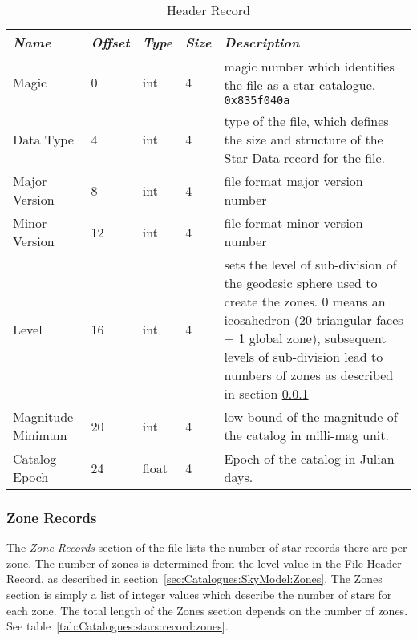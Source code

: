 \begin{table}[htbp]
\begin{tabularx}{\textwidth}{llllX}\toprule
\emph{Name} & \emph{Offset} & \emph{Type} & \emph{Size} & \emph{Description}\\\midrule
Magic             &  0 & int   & 4 & magic number which identifies the file as a star catalogue. \texttt{0x835f040a}\\%
Data Type         &  4 & int   & 4 & type of the file, which defines the size and structure 
                                   of the Star Data record for the file.\\%
Major Version     &  8 & int   & 4 & file format major version number\\%
Minor Version     & 12 & int   & 4 & file format minor version number\\%
Level             & 16 & int   & 4 & sets the level of sub-division of the geodesic sphere used to create the zones. 
                                   0 means an icosahedron (20 triangular faces + 1 global zone), 
                                   subsequent levels of sub-division lead to numbers of zones 
                                   as described in section \ref{sec:Catalogues:stars:record:zone}\\%
Magnitude Minimum & 20 & int   & 4 &  low bound of the magnitude of the catalog in milli-mag unit.  \\%
Catalog Epoch     & 24 & float & 4 &  Epoch of the catalog in Julian days.\\%
\end{tabularx}
\caption{Header Record}
\label{tab:Catalogues:stars:record:header}
\end{table}

\subsubsection{Zone Records}%
\label{sec:Catalogues:stars:record:zone}

The \emph{Zone Records} section of the file lists the number of star
records there are per zone. The number of zones is determined from the
level value in the File Header Record, as described in
section~\ref{sec:Catalogues:SkyModel:Zones}. The Zones section is
simply a list of integer values which describe the number of stars for
each zone. The total length of the Zones section depends on the number
of zones. See table~\ref{tab:Catalogues:stars:record:zones}.

